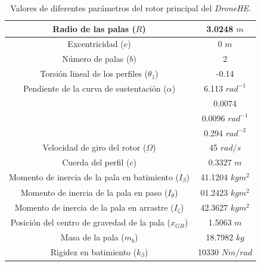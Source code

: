 \begin{table}[]
	\centering
	\begin{tabular}{|>{\columncolor{Gray}}c|c|}
		\hline
		Radio de las palas ($R$) & 3.0248 $m$ \\ \hline
		Excentricidad ($e$) & 0 $m$ \\ \hline
		Número de palas ($b$) & 2 \\ \hline
		Torsión lineal de los perfiles ($\theta_1$) & -0.14 \\ \hline
		Pendiente de la curva de sustentación ($\alpha$) & 6.113 $rad^{-1}$ \\ \hline
		\cellcolor{Gray} & 0.0074 \\ \cline{2-2} 
		\cellcolor{Gray} & 0.0096 $rad^{-1}$ \\ \cline{2-2} 
		\multirow{-3}{*}{\cellcolor{Gray}Parámetros de la polar ($\delta_0$, $\delta_1$, $\delta_2$)} & 0.294 $rad^{-2}$ \\ \hline
		Velocidad de giro del rotor ($\Omega$) & 45 $rad/s$ \\ \hline
		Cuerda del perfil ($c$) & 0.3327 $m$ \\ \hline
		Momento de inercia de la pala en batimiento ($I_\beta$) & 41.1204 $kgm^2$ \\ \hline
		Momento de inercia de la pala en paso ($I_\theta$) & 01.2423 $kgm^2$ \\ \hline
		Momento de inercia de la pala en arrastre ($I_\zeta$) & 42.3627 $kgm^2$ \\ \hline
		Posición del centro de gravedad de la pala ($x_{GB}$) & 1.5063 $m$ \\ \hline
		Masa de la pala ($m_b$) & 18.7982 $kg$ \\ \hline
		Rigidez en batimiento ($k_\beta$) & 10330 $Nm/rad$ \\ \hline
	\end{tabular}
	\caption{Valores de diferentes parámetros del rotor principal del \emph{DroneHE}.}
	\label{RPHS}
\end{table}

